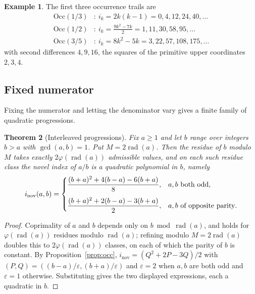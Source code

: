 \documentclass[11pt,a4paper]{article}
\theoremstyle{plain}
\newtheorem{theorem}{Theorem}[section]
\theoremstyle{definition}
\newtheorem{example}[theorem]{Example}
\theoremstyle{remark}
\DeclareMathOperator{\rad}{rad}
\begin{document}
\begin{example}\label{ex:trails}
The first three occurrence trails are
\[
\begin{aligned}
  \mathrm{Occ}(1/3) &: \ i_k = 2k(k-1) = 0, 4, 12, 24, 40, \dots \\
  \mathrm{Occ}(1/2) &: \ i_k = \tfrac{9k^2 - 7k}{2} = 1, 11, 30, 58, 95, \dots \\
  \mathrm{Occ}(3/5) &: \ i_k = 8k^2 - 5k = 3, 22, 57, 108, 175, \dots
\end{aligned}
\]
with second differences $4, 9, 16$, the squares of the primitive upper
coordinates $2, 3, 4$.
\end{example}

\subsection{Fixed numerator}

Fixing the numerator and letting the denominator vary gives a finite family of
quadratic progressions.

\begin{theorem}[Interleaved progressions]\label{thm:progressions}
Fix $a \ge 1$ and let $b$ range over integers $b > a$ with $\gcd(a,b) = 1$. Put
$M = 2\rad(a)$. Then the residue of $b$ modulo $M$ takes exactly
$2\varphi(\rad(a))$ admissible values, and on each such residue class the novel
index of $a/b$ is a quadratic polynomial in $b$, namely
\begin{equation}\label{eq:prog}
  i_{\mathrm{nov}}(a,b) =
  \begin{dcases}
    \frac{(b+a)^2 + 4(b-a) - 6(b+a)}{8}, & a, b \text{ both odd},\\[4pt]
    \frac{(b+a)^2 + 2(b-a) - 3(b+a)}{2}, & a, b \text{ of opposite parity}.
  \end{dcases}
\end{equation}
\end{theorem}

\begin{proof}
Coprimality of $a$ and $b$ depends only on $b \bmod \rad(a)$, and holds for
$\varphi(\rad(a))$ residues modulo $\rad(a)$; refining modulo $M = 2\rad(a)$
doubles this to $2\varphi(\rad(a))$ classes, on each of which the parity of $b$
is constant. By Proposition~\ref{prop:occ}, $i_{\mathrm{nov}} = (Q^2 + 2P - 3Q)/2$
with $(P,Q) = ((b-a)/\varepsilon, (b+a)/\varepsilon)$ and $\varepsilon = 2$ when
$a,b$ are both odd and $\varepsilon = 1$ otherwise. Substituting gives the two
displayed expressions, each a quadratic in $b$.
\end{proof}
\end{document}
